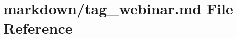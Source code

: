 \hypertarget{tag__webinar_8md}{}\section{markdown/tag\+\_\+webinar.md File Reference}
\label{tag__webinar_8md}

